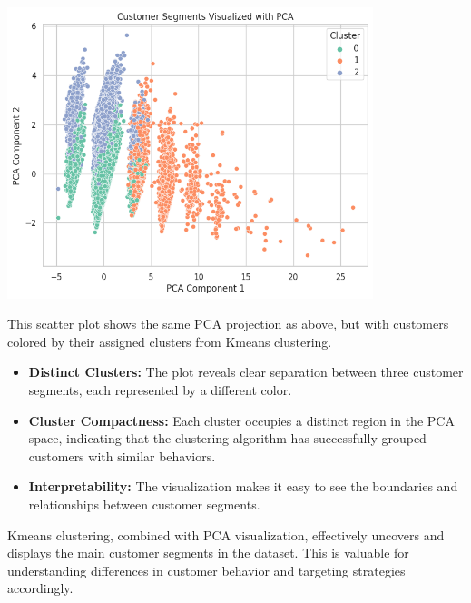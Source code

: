\documentclass[a4paper]{article}
\begin{document}
\begin{multicols}{2}
\noindent
\begin{minipage}{\columnwidth}
\centering
\includegraphics[width=0.8\textwidth]{plots/Customer Segments Visualized with PCA.png}
\label{fig:pca_kmeans}
\end{minipage}

This scatter plot shows the same PCA projection as above, but with customers colored by their assigned clusters from K\-means clustering.

\begin{itemize}
    \item \textbf{Distinct Clusters:} The plot reveals clear separation between three customer segments, each represented by a different color.
    \item \textbf{Cluster Compactness:} Each cluster occupies a distinct region in the PCA space, indicating that the clustering algorithm has successfully grouped customers with similar behaviors.
    \item \textbf{Interpretability:} The visualization makes it easy to see the boundaries and relationships between customer segments.
\end{itemize}

K\-means clustering, combined with PCA visualization, effectively uncovers and displays the main customer segments in the dataset. This is valuable for understanding differences in customer behavior and targeting strategies accordingly.

\vspace{1em}


\end{multicols}
\end{document}
